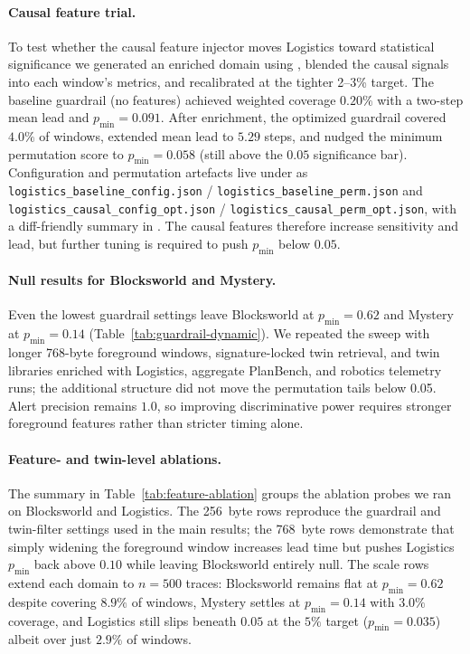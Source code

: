 \documentclass[11pt]{article}
\begin{document}
\paragraph{Causal feature trial.} To test whether the causal feature injector moves Logistics toward
statistical significance we generated an enriched domain using
, blended the causal signals into
each window's metrics, and recalibrated at the tighter 2--3\% target. The baseline
guardrail (no features) achieved weighted coverage $0.20\%$ with a two-step mean lead and
$p_{\min}=0.091$. After enrichment, the optimized guardrail covered $4.0\%$ of windows,
extended mean lead to $5.29$ steps, and nudged the minimum permutation score to
$p_{\min}=0.058$ (still above the $0.05$ significance bar). Configuration and
permutation artefacts live under  as
\texttt{logistics\_baseline\_config.json} / \texttt{logistics\_baseline\_perm.json} and
\texttt{logistics\_causal\_config\_opt.json} / \texttt{logistics\_causal\_perm\_opt.json}, with a
diff-friendly summary in . The causal features therefore
increase sensitivity and lead, but further tuning is required to push $p_{\min}$ below $0.05$.

\paragraph{Null results for Blocksworld and Mystery.} Even the lowest guardrail
settings leave Blocksworld at $p_{\min}=0.62$ and Mystery at
$p_{\min}=0.14$ (Table~\ref{tab:guardrail-dynamic}). We repeated the sweep with
longer 768-byte foreground windows, signature-locked twin retrieval, and twin
libraries enriched with Logistics, aggregate PlanBench, and robotics telemetry
runs; the additional structure did not move the permutation tails below 0.05.
Alert precision remains $1.0$, so improving discriminative power requires
stronger foreground features rather than stricter timing alone.

\paragraph{Feature- and twin-level ablations.} The summary in
Table~\ref{tab:feature-ablation} groups the ablation probes we ran on
Blocksworld and Logistics. The 256~byte rows reproduce the guardrail and
twin-filter settings used in the main results; the 768~byte rows demonstrate
that simply widening the foreground window increases lead time but pushes Logistics
$p_{\min}$ back above $0.10$ while leaving Blocksworld entirely null. The scale
rows extend each domain to $n=500$ traces: Blocksworld remains flat at
$p_{\min}=0.62$ despite covering $8.9\%$ of windows, Mystery settles at
$p_{\min}=0.14$ with $3.0\%$ coverage, and Logistics still slips beneath $0.05$
at the $5\%$ target ($p_{\min}=0.035$) albeit over just $2.9\%$ of windows.
\end{document}
